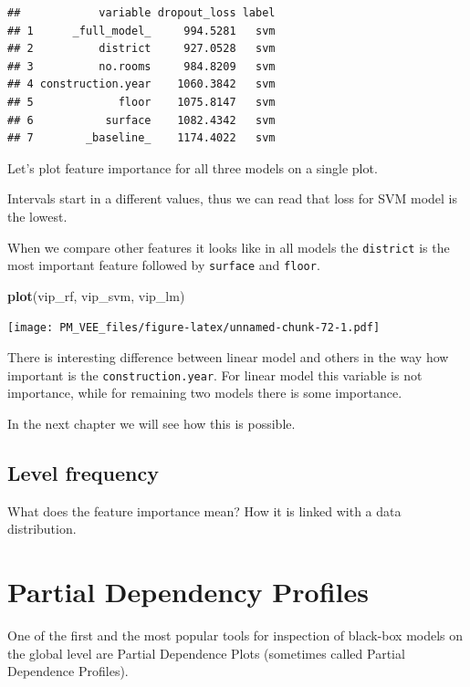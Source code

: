 \documentclass[12pt,]{krantz}
\newenvironment{Shaded}{\begin{snugshade}}{\end{snugshade}}
\newcommand{\KeywordTok}[1]{\textcolor[rgb]{0.13,0.29,0.53}{\textbf{#1}}}
\newcommand{\NormalTok}[1]{#1}
\begin{document}
\begin{verbatim}
##            variable dropout_loss label
## 1      _full_model_     994.5281   svm
## 2          district     927.0528   svm
## 3          no.rooms     984.8209   svm
## 4 construction.year    1060.3842   svm
## 5             floor    1075.8147   svm
## 6           surface    1082.4342   svm
## 7        _baseline_    1174.4022   svm
\end{verbatim}

Let's plot feature importance for all three models on a single plot.

Intervals start in a different values, thus we can read that loss for SVM model is the lowest.

When we compare other features it looks like in all models the \texttt{district} is the most important feature followed by \texttt{surface} and \texttt{floor}.

\begin{Shaded}
\begin{Highlighting}[]
\KeywordTok{plot}\NormalTok{(vip_rf, vip_svm, vip_lm)}
\end{Highlighting}
\end{Shaded}

\texttt{[image: PM\_VEE\_files/figure-latex/unnamed-chunk-72-1.pdf]}

There is interesting difference between linear model and others in the way how important is the \texttt{construction.year}. For linear model this variable is not importance, while for remaining two models there is some importance.

In the next chapter we will see how this is possible.

\hypertarget{level-frequency}{%
\subsection{Level frequency}\label{level-frequency}}

What does the feature importance mean? How it is linked with a data distribution.

\hypertarget{partialDependenceProfiles}{%
\section{Partial Dependency Profiles}\label{partialDependenceProfiles}}

One of the first and the most popular tools for inspection of black-box models on the global level are Partial Dependence Plots (sometimes called Partial Dependence Profiles).
\end{document}
